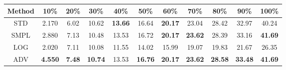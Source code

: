 \documentclass{standalone}
\begin{document}
\begin{tabular}{c|cccccccccc}
      \toprule
      Method & 10\% & 20\% & 30\% & 40\% & 50\% & 60\% & 70\% & 80\% & 90\% & 100\% \\
      \midrule
STD & 2.170 & 6.02 & 10.62 & \textbf{13.66} & 16.64 & \textbf{20.17} & 23.04 & 28.42 & 32.97 & 40.24\\
SMPL & 2.880 & 7.13 & 10.48 & 13.53 & 16.72 & \textbf{20.17} & \textbf{23.62} & 28.39 & 33.16 & \textbf{41.69}\\
LOG & 2.020 & 7.11 & 10.08 & 11.55 & 14.02 & 15.99 & 19.07 & 19.83 & 21.67 & 26.35\\
ADV & \textbf{4.550} & \textbf{7.48} & \textbf{10.74} & 13.53 & \textbf{16.76} & \textbf{20.17} & \textbf{23.62} & \textbf{28.58} & \textbf{33.48} & \textbf{41.69}\\
  \bottomrule
\end{tabular}
\end{document}
